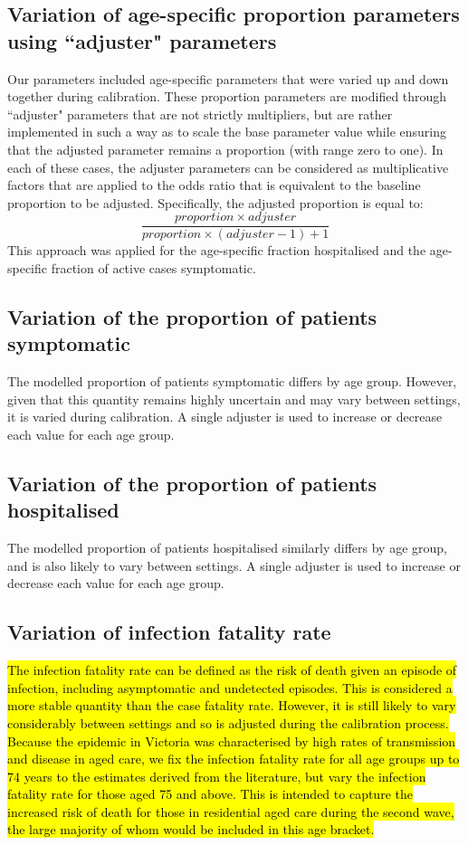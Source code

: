 \subsection{Variation of age-specific proportion parameters using ``adjuster" parameters}
Our parameters included age-specific parameters that were varied up and down together during calibration. These proportion parameters are modified through ``adjuster" parameters that are not strictly multipliers, but are rather implemented in such a way as to scale the base parameter value while ensuring that the adjusted parameter remains a proportion (with range zero to one). In each of these cases, the adjuster parameters can be considered as multiplicative factors that are applied to the odds ratio that is equivalent to the baseline proportion to be adjusted. Specifically, the adjusted proportion is equal to:
\[\frac{proportion \times adjuster}{proportion \times (adjuster-1)+1}\]
This approach was applied for the age-specific fraction hospitalised and the age-specific fraction of active cases symptomatic.

\subsection{Variation of the proportion of patients symptomatic}
The modelled proportion of patients symptomatic differs by age group. However, given that this quantity remains highly uncertain and may vary between settings, it is varied during calibration. A single adjuster is used to increase or decrease each value for each age group.

\subsection{Variation of the proportion of patients hospitalised}
The modelled proportion of patients hospitalised similarly differs by age group, and is also likely to vary between settings. A single adjuster is used to increase or decrease each value for each age group.

\subsection{Variation of infection fatality rate}

\hl{The infection fatality rate can be defined as the risk of death given an episode of infection, including asymptomatic and undetected episodes. This is considered a more stable quantity than the case fatality rate. However, it is still likely to vary considerably between settings and so is adjusted during the calibration process. Because the epidemic in Victoria was characterised by high rates of transmission and disease in aged care, we fix the infection fatality rate for all age groups up to 74 years to the estimates derived from the literature, but vary the infection fatality rate for those aged 75 and above. This is intended to capture the increased risk of death for those in residential aged care during the second wave, the large majority of whom would be included in this age bracket.}

